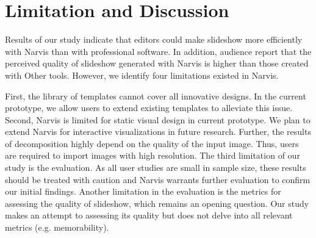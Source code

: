 \section{Limitation and Discussion}

Results of our study indicate that editors could make slideshow more efficiently with Narvis than with professional software. In addition, audience report that the perceived quality of slideshow generated with Narvis is higher than those created with Other tools. However, we identify four limitations existed in Narvis.

First, the library of templates cannot cover all innovative designs. In the current prototype, we allow users to extend existing templates to alleviate this issue. 
Second, Narvis is limited for static visual design in current prototype. We plan to extend Narvis for interactive visualizations in future research. Further, the results of decomposition highly depend on the quality of the input image. Thus, users are required to import images with high resolution. 
The third limitation of our study is the evaluation. As all user studies are small in sample size, these results should be treated with caution and Narvis warrants further evaluation to confirm our initial findings. Another limitation in the evaluation is the metrics for assessing the quality of slideshow, which remains an opening question. Our study makes an attempt to assessing its quality but does not delve into all relevant metrics (e.g. memorability).





